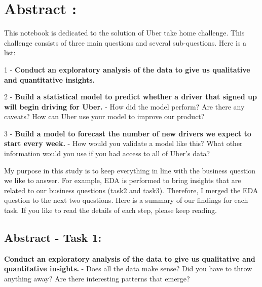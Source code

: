 \documentclass[11pt]{article}
\begin{document}
    \section{Abstract :}\label{abstract}

This notebook is dedicated to the solution of Uber take home challenge.
This challenge consists of three main questions and several
sub-questions. Here is a list:

1 - \textbf{Conduct an exploratory analysis of the data to give us
qualitative and quantitative insights.}

2 - \textbf{Build a statistical model to predict whether a driver that
signed up will begin driving for Uber.} - How did the model perform? Are
there any caveats? How can Uber use your model to improve our product?

3 - \textbf{Build a model to forecast the number of new drivers we
expect to start every week.} - How would you validate a model like this?
What other information would you use if you had access to all of Uber's
data?

My purpose in this study is to keep everything in line with the business
question we like to answer. For example, EDA is performed to bring
insights that are related to our business questions (task2 and task3).
Therefore, I merged the EDA question to the next two questions. Here is
a summary of our findings for each task. If you like to read the details
of each step, please keep reading.

\subsection{Abstract - Task 1:}\label{abstract---task-1}

\textbf{Conduct an exploratory analysis of the data to give us
qualitative and quantitative insights.} - Does all the data make sense?
Did you have to throw anything away? Are there interesting patterns that
emerge?
\end{document}
